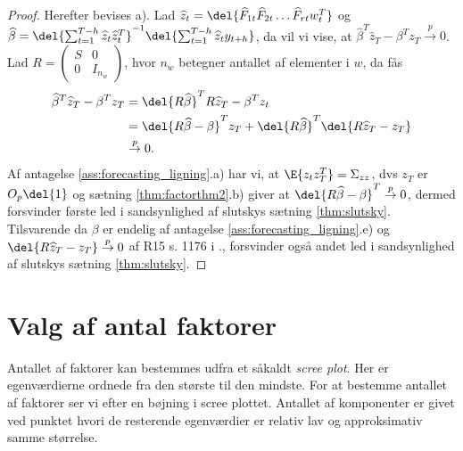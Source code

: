 \begin{proof}
Herefter bevises a).
Lad \(\widehat{z}_t = \del{\widehat{F}_{1t} \widehat{F}_{2t} \dots \widehat{F}_{rt} w_t^T}\) og \(\widehat{\beta} = \del{\sum_{t=1}^{T-h} \widehat{z}_t \widehat{z}_t^T}^{-1} \del{\sum_{t=1}^{T-h} \widehat{z}_t y_{t+h}}\), da vil vi vise, at \(\widehat{\beta}^T \widehat{z}_T - \beta^T z_T \overset{p}{\rightarrow} 0\).
Lad \(R = \begin{pmatrix}
S & 0 \\ 0 & I_{n_w}
\end{pmatrix}\), hvor \(n_w\) betegner antallet af elementer i \(w\), da fås
\begin{align*}
\widehat{\beta}^T \widehat{z}_T - \beta^T z_T &= \del{R \widehat{\beta}}^T R \widehat{z}_T - \beta^T z_t \\
&= \del{R \widehat{\beta} - \beta}^T z_T + \del{R \widehat{\beta}}^T \del{R \widehat{z}_T - z_T} \\
&\overset{p}{\rightarrow} 0.
\end{align*}
Af antagelse \ref{ass:forecasting_ligning}.a) har vi, at \(\E{z_t z_T^T} = \Sigma_{zz}\), dvs \(z_T\) er \(O_p \del{1}\) og sætning \ref{thm:factorthm2}.b) giver at \(\del{R \widehat{\beta} - \beta}^T \overset{p}{\rightarrow} 0\), dermed forsvinder første led i sandsynlighed af slutskys sætning \ref{thm:slutsky}.
Tilsvarende da \(\beta\) er endelig af antagelse \ref{ass:forecasting_ligning}.e) og \(\del{R \widehat{z}_T - z_T} \overset{p}{\rightarrow} 0\) af R15 s. 1176 i \citep{stock_watson_2002a}., forsvinder også andet led i sandsynlighed af slutskys sætning \ref{thm:slutsky}. 
\end{proof}

\section{Valg af antal faktorer}
Antallet af faktorer kan bestemmes udfra et såkaldt \textit{scree plot}.
Her er egenværdierne ordnede fra den største til den mindste.
For at bestemme antallet af faktorer ser vi efter en bøjning i scree plottet.
Antallet af komponenter er givet ved punktet hvori de resterende egenværdier er relativ lav og approksimativ samme størrelse.

